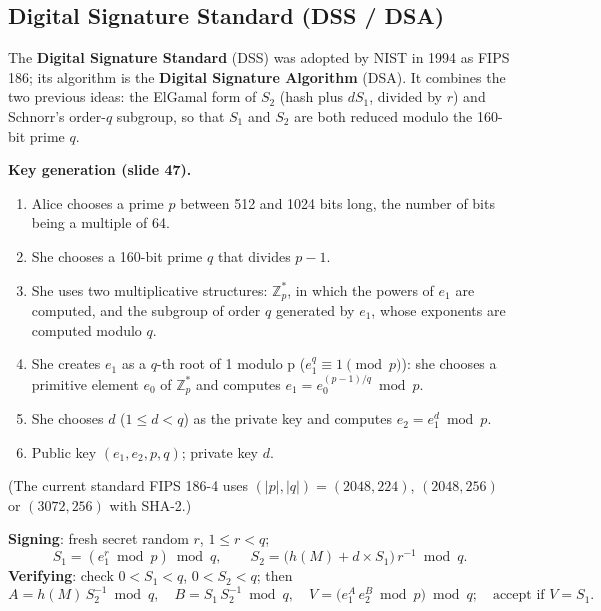 \subsection{Digital Signature Standard (DSS / DSA) \hot}

The \textbf{Digital Signature Standard} (DSS) was adopted by NIST in 1994 as FIPS 186; its algorithm is the \textbf{Digital Signature Algorithm} (DSA). It combines the two previous ideas: the ElGamal form of $S_2$ (hash plus $d S_1$, divided by $r$) and Schnorr's order-$q$ subgroup, so that $S_1$ and $S_2$ are both reduced modulo the 160-bit prime $q$.

\textbf{Key generation (slide 47).}
\begin{enumerate}[leftmargin=1.6em]
  \item Alice chooses a prime $p$ between 512 and 1024 bits long, the number of bits being a multiple of 64.
  \item She chooses a 160-bit prime $q$ that divides $p - 1$.
  \item She uses two multiplicative structures: $\mathbb{Z}_p^*$, in which the powers of $e_1$ are computed, and the subgroup of order $q$ generated by $e_1$, whose exponents are computed modulo $q$.
  \item She creates $e_1$ as a $q$-th root of 1 modulo p ($e_1^q \equiv 1 \pmod p$): she chooses a primitive element $e_0$ of $\mathbb{Z}_p^*$ and computes $e_1 = e_0^{(p-1)/q} \bmod p$.
  \item She chooses $d$ ($1 \le d < q$) as the private key and computes $e_2 = e_1^d \bmod p$.
  \item Public key $(e_1, e_2, p, q)$; private key $d$.
\end{enumerate}
(The current standard FIPS 186-4 uses $(|p|, |q|) = (2048, 224)$, $(2048, 256)$ or $(3072, 256)$ with SHA-2.)

\begin{mustknow}[: DSS]
\textbf{Signing}: fresh secret random $r$, $1 \le r < q$;
\[
S_1 = (e_1^r \bmod p) \bmod q, \qquad S_2 = \big(h(M) + d \times S_1\big)\, r^{-1} \bmod q .
\]
\textbf{Verifying}: check $0 < S_1 < q$, $0 < S_2 < q$; then
\[
A = h(M)\,S_2^{-1} \bmod q, \quad B = S_1\,S_2^{-1} \bmod q, \quad V = \big(e_1^{A}\, e_2^{B} \bmod p\big) \bmod q ;\quad \text{accept if } V = S_1 .
\]
\end{mustknow}

